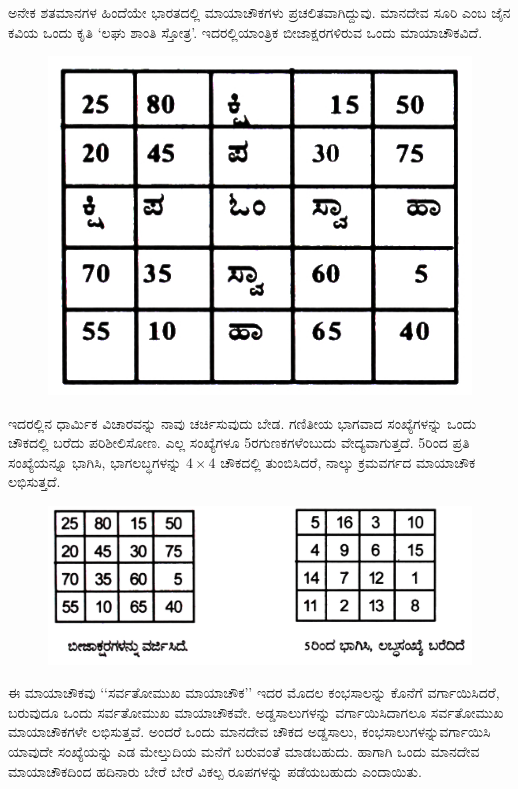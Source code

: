 ಅನೇಕ ಶತಮಾನಗಳ ಹಿಂದೆಯೇ ಭಾರತದಲ್ಲಿ ಮಾಯಾಚೌಕಗಳು ಪ್ರಚಲಿತವಾಗಿದ್ದುವು. ಮಾನದೇವ ಸೂರಿ ಎಂಬ ಜೈನ ಕವಿಯ ಒಂದು ಕೃತಿ ‘ಲಘು ಶಾಂತಿ ಸ್ತೋತ್ರ’. ಇದರಲ್ಲಿ\break ಯಾಂತ್ರಿಕ ಬೀಜಾಕ್ಷರಗಳಿರುವ ಒಂದು ಮಾಯಾಚೌಕವಿದೆ.
\begin{figure}[H]
\includegraphics[scale=.8]{src/figures/chap4/fig4.8.jpg}
\end{figure}
ಇದರಲ್ಲಿನ ಧಾರ್ಮಿಕ ವಿಚಾರ\-ವನ್ನು ನಾವು ಚರ್ಚಿಸುವುದು ಬೇಡ. ಗಣಿತೀಯ ಭಾಗವಾದ ಸಂಖ್ಯೆಗಳನ್ನು ಒಂದು ಚೌಕ\-ದಲ್ಲಿ ಬರೆದು ಪರಿಶೀಲಿಸೋಣ. ಎಲ್ಲ ಸಂಖ್ಯೆಗಳೂ 5ರ\break ಗುಣಕಗಳೆಂಬುದು ವೇದ್ಯವಾಗು\-ತ್ತದೆ. 5ರಿಂದ ಪ್ರತಿ ಸಂಖ್ಯೆಯನ್ನೂ ಭಾಗಿಸಿ, ಭಾಗಲಬ್ಧ\-ಗಳನ್ನು  $4 \times 4$ ಚೌಕದಲ್ಲಿ ತುಂಬಿಸಿದರೆ, ನಾಲ್ಕು ಕ್ರಮವರ್ಗದ ಮಾಯಾಚೌಕ ಲಭಿಸುತ್ತದೆ.
\begin{figure}[H]
\includegraphics[scale=.8]{src/figures/chap4/fig4.9.jpg}
\end{figure}

\newpage

ಈ ಮಾಯಾಚೌಕವು ‘‘ಸರ್ವತೋಮುಖ ಮಾಯಾಚೌಕ’’ ಇದರ ಮೊದಲ ಕಂಭ\break ಸಾಲನ್ನು ಕೊನೆಗೆ ವರ್ಗಾಯಿಸಿದರೆ, ಬರುವುದೂ ಒಂದು ಸರ್ವತೋಮುಖ ಮಾಯಾ\-ಚೌಕವೇ. ಅಡ್ಡಸಾಲುಗಳನ್ನು ವರ್ಗಾಯಿಸಿದಾಗಲೂ ಸರ್ವತೋಮುಖ ಮಾಯಾ\-ಚೌಕಗಳೇ ಲಭಿಸುತ್ತವೆ. ಅಂದರೆ ಒಂದು ಮಾನದೇವ ಚೌಕದ ಅಡ್ಡಸಾಲು, ಕಂಭಸಾಲುಗಳನ್ನು\break ವರ್ಗಾಯಿಸಿ ಯಾವುದೇ ಸಂಖ್ಯೆಯನ್ನು ಎಡ ಮೇಲ್ತುದಿಯ ಮನೆಗೆ ಬರುವಂತೆ ಮಾಡ\-ಬಹುದು. ಹಾಗಾಗಿ ಒಂದು ಮಾನದೇವ ಮಾಯಾಚೌಕದಿಂದ ಹದಿನಾರು ಬೇರೆ ಬೇರೆ ವಿಕಲ್ಪ ರೂಪಗಳನ್ನು ಪಡೆಯಬಹುದು ಎಂದಾಯಿತು.

